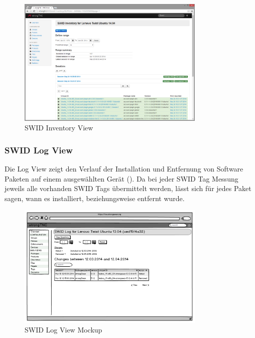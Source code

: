 \begin{figure}[H]
\centering
\includegraphics[width=0.8\textwidth]{./images/Views/inventory-view}
\caption{SWID Inventory View}
\label{fig:tag-detail-view}
\end{figure}


\subsubsection{SWID Log View}

Die Log View zeigt den Verlauf der Installation und Entfernung von Software Paketen auf
einem ausgewählten Gerät (). Da bei jeder SWID Tag Messung jeweils alle
vorhanden SWID Tags übermittelt werden, lässt sich für jedes Paket sagen, wann
es installiert, beziehungsweise entfernt wurde. 

\begin{figure}[H]
\centering
\includegraphics[width=0.8\textwidth]{./images/mockups/swid-log}
\caption{SWID Log View Mockup}
\label{fig:swid-log}
\end{figure}

